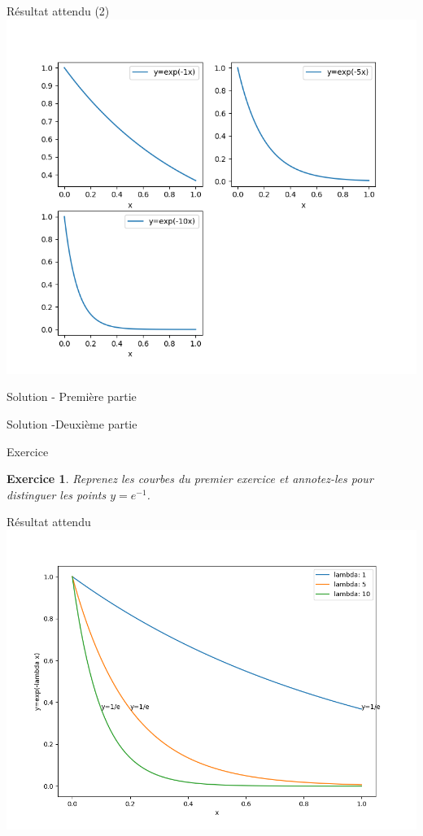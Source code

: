 \documentclass[11pt]{beamer}
\newtheorem{exercice}{Exercice}
\newcommand{\Python}[1]{
	{\small	}
}
\begin{document}
\begin{frame}{Résultat attendu (2)}
\includegraphics[scale=0.45]{ex202}
\end{frame}

\begin{frame}{Solution - Première partie}
\Python{ex201}
\end{frame}

\begin{frame}{Solution -Deuxième partie}
\Python{ex202}
\end{frame}

\begin{frame}{Exercice}
\begin{exercice}
Reprenez les courbes du premier exercice et annotez-les pour distinguer les points $y=e^{-1}$.
\end{exercice}
\end{frame}

\begin{frame}{Résultat attendu}
\includegraphics[scale=0.45]{ex203}
\end{frame}
\end{document}
